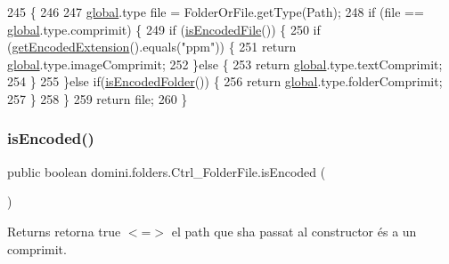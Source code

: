 \begin{DoxyCode}
245                                            \{
246 
247         \hyperlink{namespaceglobal}{global}.type file = FolderOrFile.getType(Path);
248         \textcolor{keywordflow}{if} (file == \hyperlink{namespaceglobal}{global}.type.comprimit) \{
249             \textcolor{keywordflow}{if} (\hyperlink{classdomini_1_1folders_1_1Ctrl__FolderFile_a3198690e1ecc46e00431f35d87080d79}{isEncodedFile}()) \{
250                 \textcolor{keywordflow}{if} (\hyperlink{classdomini_1_1folders_1_1Ctrl__FolderFile_a61d9dfde0932787a2398af3ddf99c34b}{getEncodedExtension}().equals(\textcolor{stringliteral}{"ppm"})) \{
251                     \textcolor{keywordflow}{return} \hyperlink{namespaceglobal}{global}.type.imageComprimit;
252                 \}\textcolor{keywordflow}{else} \{
253                     \textcolor{keywordflow}{return} \hyperlink{namespaceglobal}{global}.type.textComprimit;
254                 \}
255             \}\textcolor{keywordflow}{else} \textcolor{keywordflow}{if}(\hyperlink{classdomini_1_1folders_1_1Ctrl__FolderFile_a095e6037e5cdf9a43806a308ca028791}{isEncodedFolder}()) \{
256                 \textcolor{keywordflow}{return} \hyperlink{namespaceglobal}{global}.type.folderComprimit;
257             \}
258         \}
259         \textcolor{keywordflow}{return} file;
260     \}
\end{DoxyCode}
\mbox{\label{classdomini_1_1folders_1_1Ctrl__FolderFile_a47a7ad955f1c579384dfba08bc7be8e0}} 
\subsubsection{\texorpdfstring{is\+Encoded()}{isEncoded()}}
{\footnotesize\ttfamily public boolean domini.\+folders.\+Ctrl\+\_\+\+Folder\+File.\+is\+Encoded (\begin{DoxyParamCaption}{ }\end{DoxyParamCaption})\hspace{0.3cm}{\ttfamily [inline]}}

\begin{DoxyReturn}{Returns}
retorna true $<$=$>$ el path que s\textquotesingle{}ha passat al constructor és a un comprimit. 
\end{DoxyReturn}

